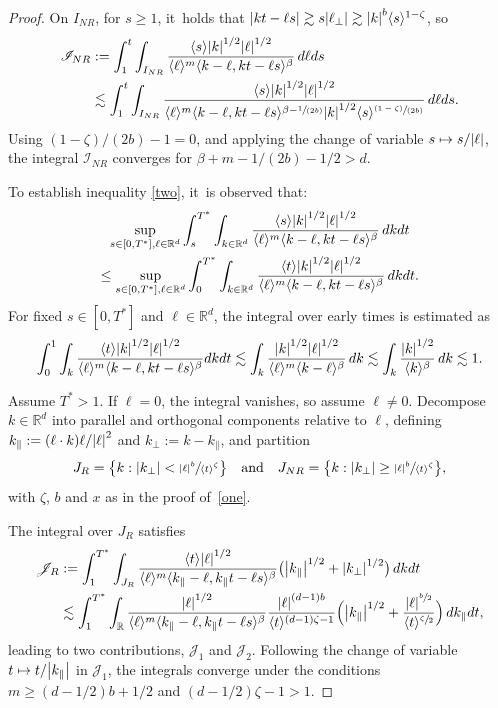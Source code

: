 \documentclass[10pt,a4paper]{article}
\newcommand{\spfrac}[2]{\sfrac{#1}{(#2)}}
\newcommand{\pspfrac}[2]{\sfrac{(#1)}{(#2)}}
\theoremstyle{plain}
\theoremstyle{remark}
\newcommand{\bbr}[1]{\bigl(#1 \bigr)}
\newcommand{\Bbr}[1]{\Bigl(#1 \Bigr)}
\newcommand{\ak}{\abs{k}}
\newcommand{\jb}[1]{\langle#1\rangle}
\newcommand{\bset}[1]{\bigl\{#1\bigr\}}
\newcommand{\qaq}{\quad\text{and}\quad}
\newcommand{\para}{\parallel}
\newcommand{\R}{\mathbb{R}}
\begin{document}
\begin{proof}
On $I_{NR}$, for $s\geq1$, it~holds that $\abs{kt-\ell s }\gtrsim s \abs{\ell_\perp}\gtrsim\ak^b\jb{ s }^{1-\zeta}$, so
\begin{align*}
\mathscr I_{NR}&:=\int_1^t\int_{I_{NR}}\frac{\jb{ s }\ak^{1/2}\abs{\ell}^{1/2}}{\jb{\ell}^m\jb{k-\ell,kt-\ell s}^{\beta}}\,d\ell d s \\
&\lesssim\int_1^t\int_{I_{NR}}\frac{\jb{s}\ak^{1/2}\abs{\ell}^{1/2}}{\jb{\ell}^m\jb{k-\ell,kt-\ell s}^{\beta-\spfrac{1}{2b}}\ak^{1/2}\jb{s}^{\pspfrac{1-\zeta}{2b}}}\,d\ell d s .
\end{align*}
Using $(1-\zeta)/(2b)-1=0$, and applying the change of variable $s\mapsto s/\abs{\ell}$, the integral $\mathscr I_{NR}$ converges for $\beta+m-1/(2b)-1/2>d$.

\pagebreak[2]
To establish inequality \eqref{two}, it~is observed that:
\begin{multline*}
\sup_{s\in[0,T^*],\ell\in\R^d}\int_{s}^{T^*}\int_{k\in\R^d}\frac{\jb{ s }\ak^{1/2}\abs{\ell}^{1/2}}{\jb{\ell}^m\jb{k-\ell,kt-\ell s }^{\beta}}\,dk d t \\
\leq \sup_{s\in[0,T^*],\ell\in\R^d}\int_{0}^{T^*}\int_{k\in\R^d}\frac{\jb{t }\ak^{1/2}\abs{\ell}^{1/2}}{\jb{\ell}^m\jb{k-\ell,kt-\ell s }^{\beta}}\,dk d t.
\end{multline*}
For fixed $s \in [0, T^*]$ and $\ell \in \mathbb{R}^d$, the integral over early times is estimated as
\begin{align*}
\int_{0}^{1}\int_{k}\frac{\jb{t }\ak^{1/2}\abs{\ell}^{1/2}}{\jb{\ell}^m\jb{k-\ell,kt-\ell s }^{\beta}}dk d t\lesssim\int_k\frac{\ak^{1/2}\abs{\ell}^{1/2}}{\jb{\ell}^m\jb{k-\ell}^{\beta}}\,dk\lesssim\int_k\frac{\ak^{1/2}}{\jb{k}^{\beta}}\,dk\lesssim1.
\end{align*}

Assume $T^* > 1$. If $\ell=0$, the integral vanishes, so assume $\ell\neq0$. Decompose $k\in\R^d$ into parallel and orthogonal components relative to $\ell$, defining $k_\para:=(\ell\cdot k)\ell/\abs{\ell}^2$ and $k_\perp:=k-k_\para$, and partition
\begin{align*}
J_R=\bset{k:\abs{k_\perp}<\sfrac{\abs{\ell}^b}{\jb{ t }^\zeta}}\qaq J_{NR}=\bset{k:\abs{k_\perp}\geq\sfrac{\abs{\ell}^b}{\jb{ t }^\zeta}},
\end{align*}with $\zeta$, $b$ and $x$ as in the proof of~\eqref{one}.

The integral over $J_R$ satisfies
\begin{align*}
\mathscr J_{R}&:=\int_1^{T^*}\int_{J_{R}} \frac{\jb{t}\abs{\ell}^{1/2}}{\jb{\ell}^m\jb{k_\para-\ell,k_\para t-\ell s}^\beta}\bbr{\abs{k_\para}^{1/2}+\abs{k_\perp}^{1/2}}\,dk dt\\
&\lesssim\int_1^{T^*}\int_{\R} \frac{\abs{\ell}^{1/2}}{\jb{\ell}^m\jb{k_\para-\ell,k_\para t-\ell s}^\beta}\frac{\abs{\ell}^{(d-1)b}}{\jb{t}^{(d-1)\zeta-1}}\Bbr{\abs{k_\para}^{1/2}+\frac{\abs{\ell}^{\sfrac{b}{2}}}{\jb{t}^{\sfrac{\zeta}{2}}}}\,dk_\para dt,
\end{align*}
leading to two contributions, $\mathscr J_1$ and $\mathscr J_2$. Following the change of variable $t\mapsto t/\abs{k_\para}$ in $\mathscr J_1$, the integrals converge under the conditions $m\geq(d-1/2)b+1/2$ and $(d-1/2)\zeta - 1 > 1$.


\end{proof}
\end{document}
